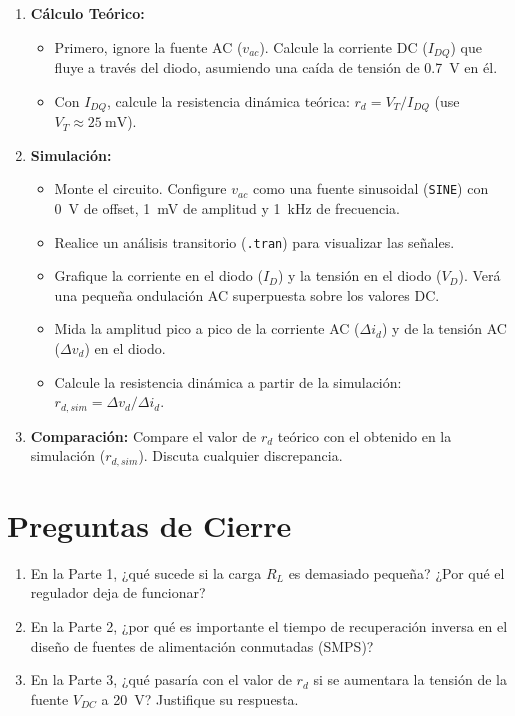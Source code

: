 \documentclass[12pt, a4paper]{article}
\newcommand{\code}[1]{\texttt{#1}}
\begin{document}
\begin{enumerate}
    \item \textbf{Cálculo Teórico:}
    \begin{itemize}
        \item Primero, ignore la fuente AC ($v_{ac}$). Calcule la corriente DC ($I_{DQ}$) que fluye a través del diodo, asumiendo una caída de tensión de \SI{0.7}{\volt} en él.
        \item Con $I_{DQ}$, calcule la resistencia dinámica teórica: $r_d = V_T / I_{DQ}$ (use $V_T \approx \SI{25}{\milli\volt}$).
    \end{itemize}

    \item \textbf{Simulación:}
    \begin{itemize}
        \item Monte el circuito. Configure $v_{ac}$ como una fuente sinusoidal (\code{SINE}) con \SI{0}{\volt} de offset, \SI{1}{\milli\volt} de amplitud y \SI{1}{\kilo\hertz} de frecuencia.
        \item Realice un análisis transitorio (\code{.tran}) para visualizar las señales.
        \item Grafique la corriente en el diodo ($I_D$) y la tensión en el diodo ($V_D$). Verá una pequeña ondulación AC superpuesta sobre los valores DC.
        \item Mida la amplitud pico a pico de la corriente AC ($\Delta i_d$) y de la tensión AC ($\Delta v_d$) en el diodo.
        \item Calcule la resistencia dinámica a partir de la simulación: $r_{d,sim} = \Delta v_d / \Delta i_d$.
    \end{itemize}

    \item \textbf{Comparación:} Compare el valor de $r_d$ teórico con el obtenido en la simulación ($r_{d,sim}$). Discuta cualquier discrepancia.
\end{enumerate}

\section*{Preguntas de Cierre}
\begin{enumerate}
    \item En la Parte 1, ¿qué sucede si la carga $R_L$ es demasiado pequeña? ¿Por qué el regulador deja de funcionar?
    \item En la Parte 2, ¿por qué es importante el tiempo de recuperación inversa en el diseño de fuentes de alimentación conmutadas (SMPS)?
    \item En la Parte 3, ¿qué pasaría con el valor de $r_d$ si se aumentara la tensión de la fuente $V_{DC}$ a \SI{20}{\volt}? Justifique su respuesta.
\end{enumerate}
\end{document}
